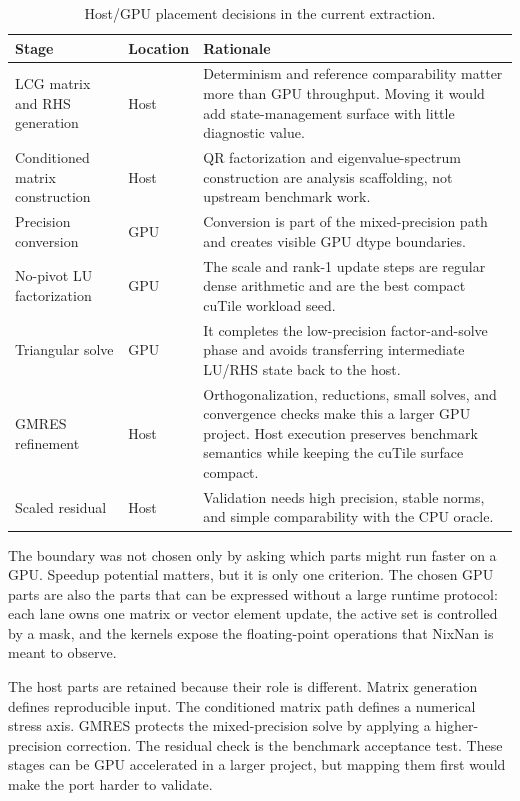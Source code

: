 \documentclass[11pt]{article}
\newcommand{\cutile}{cuTile}
\newcommand{\nixnan}{NixNan}
\begin{document}
\begin{table}[htbp]
\centering
\small
\begin{tabular}{P{0.24\textwidth}P{0.16\textwidth}P{0.52\textwidth}}
\toprule
Stage & Location & Rationale \\
\midrule
LCG matrix and RHS generation & Host & Determinism and reference comparability matter more than GPU throughput. Moving it would add state-management surface with little diagnostic value. \\
Conditioned matrix construction & Host & QR factorization and eigenvalue-spectrum construction are analysis scaffolding, not upstream benchmark work. \\
Precision conversion & GPU & Conversion is part of the mixed-precision path and creates visible GPU dtype boundaries. \\
No-pivot LU factorization & GPU & The scale and rank-1 update steps are regular dense arithmetic and are the best compact \cutile{} workload seed. \\
Triangular solve & GPU & It completes the low-precision factor-and-solve phase and avoids transferring intermediate LU/RHS state back to the host. \\
GMRES refinement & Host & Orthogonalization, reductions, small solves, and convergence checks make this a larger GPU project. Host execution preserves benchmark semantics while keeping the \cutile{} surface compact. \\
Scaled residual & Host & Validation needs high precision, stable norms, and simple comparability with the CPU oracle. \\
\bottomrule
\end{tabular}
\caption{Host/GPU placement decisions in the current extraction.}
\label{tab:boundary}
\end{table}

The boundary was not chosen only by asking which parts might run faster on a
GPU. Speedup potential matters, but it is only one criterion. The chosen GPU
parts are also the parts that can be expressed without a large runtime
protocol: each lane owns one matrix or vector element update, the active set is
controlled by a mask, and the kernels expose the floating-point operations that
\nixnan{} is meant to observe.

The host parts are retained because their role is different. Matrix generation
defines reproducible input. The conditioned matrix path defines a numerical
stress axis. GMRES protects the mixed-precision solve by applying a
higher-precision correction. The residual check is the benchmark acceptance
test. These stages can be GPU accelerated in a larger project, but mapping
them first would make the port harder to validate.
\end{document}
